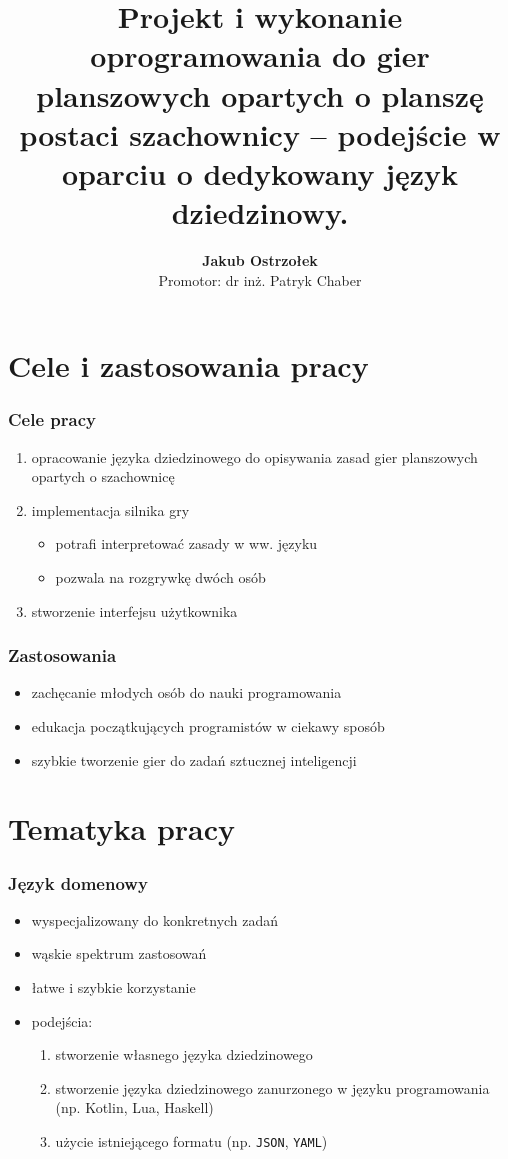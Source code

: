 \documentclass{beamer}
\title[Silnik gier opartych o szachownicę \insertframenumber/\inserttotalframenumber]{
   Projekt i wykonanie oprogramowania do gier planszowych opartych
   o planszę postaci szachownicy -- podejście w oparciu o dedykowany
   język dziedzinowy.}
\author[Jakub Ostrzołek]{\textbf{Jakub Ostrzołek} \\%
\footnotesize Promotor: dr inż. Patryk Chaber}
\institute{Instytut Automatyki i Informatyki Stosowanej\\%
Politechnika Warszawska}
\begin{document}
\frame{\titlepage}


\section{Cele i zastosowania pracy}

\begin{frame}
	\frametitle{Cele pracy}
	\begin{enumerate}
		\item opracowanie języka dziedzinowego do opisywania zasad gier planszowych opartych o szachownicę
		\item implementacja silnika gry
		      \begin{itemize}
			      \item potrafi interpretować zasady w ww. języku
			      \item pozwala na rozgrywkę dwóch osób
		      \end{itemize}
		\item stworzenie interfejsu użytkownika
	\end{enumerate}
\end{frame}

\begin{frame}
	\frametitle{Zastosowania}
	\begin{itemize}
		\item zachęcanie młodych osób do nauki programowania
		\item edukacja początkujących programistów w ciekawy sposób
		\item szybkie tworzenie gier do zadań sztucznej inteligencji
	\end{itemize}
\end{frame}

\section{Tematyka pracy}

\begin{frame}
	\frametitle{Język domenowy}
	\begin{itemize}
		\item wyspecjalizowany do konkretnych zadań
		\item wąskie spektrum zastosowań
		\item łatwe i szybkie korzystanie
		\item podejścia:
		\begin{enumerate}
			\item stworzenie własnego języka dziedzinowego
			\item stworzenie języka dziedzinowego zanurzonego w języku programowania (np. Kotlin, Lua, Haskell)
			\item użycie istniejącego formatu (np. {\tt JSON}, {\tt YAML})
		\end{enumerate} 
	\end{itemize}
\end{frame}
\end{document}
